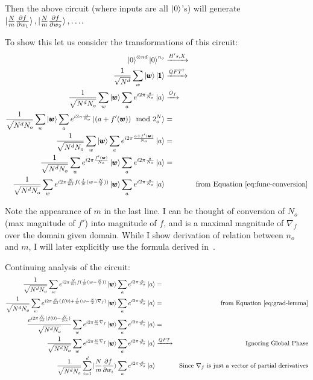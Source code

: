 \documentclass{article}
\begin{document}
Then the above circuit (where inputs are all $\ket{0}$'s) will generate $\ket{\frac{N}{m}\frac{\partial f}{\partial w_1}}, \ket{\frac{N}{m}\frac{\partial f}{\partial w_2}}, \hdots$.

To show this let us consider the transformations of this circuit:
\begin{align}
    \ket{0}^{\otimes nd}\ket{0}^{n_o} &\xrightarrow{H's, X} \\
    \frac{1}{\sqrt{N^d}} \sum\limits_{w} \ket{\pmb{w}} \ket{\pmb{1}} &\xrightarrow{QFT^\dagger} \\
    \frac{1}{\sqrt{N^d N_o}} \sum\limits_{w}\ket{\pmb{w}}\sum\limits_{a}e^{i2\pi\frac{a}{N_o}}\ket{a} &\xrightarrow{O_f} \\
    \frac{1}{\sqrt{N^d N_o}} \sum\limits_{w}\ket{\pmb{w}}\sum\limits_{a}e^{i2\pi\frac{a}{N_o}}\ket{(a + f'(\pmb{w})) \mod 2^N_o} &= \\
    \frac{1}{\sqrt{N^d N_o}} \sum\limits_{w}\ket{\pmb{w}}\sum\limits_{a}e^{i2\pi\frac{a + f'(\pmb{w})}{N_o}}\ket{a} &= \\
    \frac{1}{\sqrt{N^d N_o}} \sum\limits_{w}e^{i2\pi\frac{f'(\pmb{w})}{N_o}}\ket{\pmb{w}}\sum\limits_{a}e^{i2\pi\frac{a}{N_o}}\ket{a} &= \\
    \frac{1}{\sqrt{N^d N_o}} \sum\limits_{w}e^{i2\pi\frac{N}{ml}f(\frac{l}{N}(w - \frac{N}{2}))}\ket{\pmb{w}}\sum\limits_{a}e^{i2\pi\frac{a}{N_o}}\ket{a} & & \text{from Equation~\ref{eq:func-conversion}}
\end{align}

Note the appearance of $m$ in the last line. I can be thought of conversion of $N_o$ (max magnitude of $f'$) into magnitude of $f$, and is a maximal magnitude of $\nabla_f$ over the domain given domain.
While I show derivation of relation between $n_o$ and $m$, I will later explicitly use the formula derived in~\cite{Jordan_2005}.

Continuing analysis of the circuit:
\begin{align}
    \frac{1}{\sqrt{N^d N_o}} \sum\limits_{w}e^{i2\pi\frac{N}{ml}f(\frac{l}{N}(w - \frac{N}{2}))}\ket{\pmb{w}}\sum\limits_{a}e^{i2\pi\frac{a}{N_o}}\ket{a} &= \\
    \frac{1}{\sqrt{N^d N_o}} \sum\limits_{w}e^{i2\pi\frac{N}{ml}(f(0) + \frac{l}{N}(w - \frac{N}{2})\nabla_f)}\ket{\pmb{w}}\sum\limits_{a}e^{i2\pi\frac{a}{N_o}}\ket{a} &= & \text{from Equation~\ref{eq:grad-lemma}} \\
    \frac{e^{i2\pi\frac{N}{ml}(f(0) - \frac{N}{2m})}}{\sqrt{N^d N_o}} \sum\limits_{w}e^{i2\pi\frac{w}{m}\nabla_f}\ket{\pmb{w}}\sum\limits_{a}e^{i2\pi\frac{a}{N_o}}\ket{a} &= \\
    \frac{1}{\sqrt{N^d N_o}} \sum\limits_{w}e^{i2\pi\frac{w}{m}\nabla_f}\ket{\pmb{w}}\sum\limits_{a}e^{i2\pi\frac{a}{N_o}}\ket{a} &\xrightarrow{QFT} & \text{Ignoring Global Phase}\\
    \frac{1}{\sqrt{N^d N_o}} \sum\limits_{i = 1}^d \ket{\frac{N}{m}\frac{\partial f}{\partial w_i}}\sum\limits_{a}e^{i2\pi\frac{a}{N_o}}\ket{a} & & \text{Since $\nabla_f$ is just a vector of partial derivatives}
\end{align}
\end{document}

